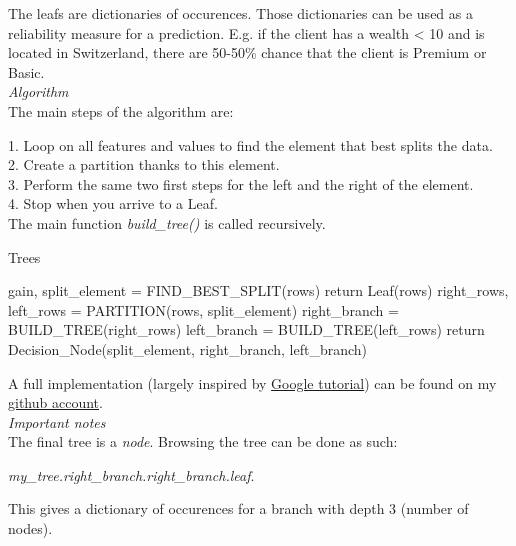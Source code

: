The leafs are dictionaries of occurences. Those dictionaries can be used as a reliability measure for a prediction. E.g. if the client has a wealth < 10 and is located in Switzerland, there are 50-50\% chance that the client is Premium or Basic. \\

\textit{Algorithm} \\

The main steps of the algorithm are:

1. Loop on all features and values to find the element that best splits the data.\\
2. Create a partition thanks to this element. \\

3. Perform the same two first steps for the left and the right of the element. \\
4. Stop when you arrive to a Leaf. \\

The main function \textit{build\_tree()} is called recursively. 

\pagebreak

\begin{algorithm}
\caption{Trees}
\begin{algorithmic}
\State gain, split\_element = FIND\_BEST\_SPLIT(rows)
\State return Leaf(rows)
\EndIf
\State right\_rows, left\_rows = PARTITION(rows, split\_element)
\State right\_branch = BUILD\_TREE(right\_rows)
\State left\_branch = BUILD\_TREE(left\_rows)
\State return Decision\_Node(split\_element, right\_branch, left\_branch)
\EndProcedure
\end{algorithmic}
\end{algorithm}

A full implementation (largely inspired by \href{https://github.com/random-forests/tutorials/blob/master/decision_tree.ipynb}{Google tutorial}) can be found on my \href{https://github.com/savoga/various_projects/blob/master/trees_from_scratch.py}{github account}. \\

\textit{Important notes} \\

The final tree is a \textit{node}. Browsing the tree can be done as such: 

\textit{my\_tree.right\_branch.right\_branch.leaf}. 

This gives a dictionary of occurences for a branch with depth 3 (number of nodes). \\

